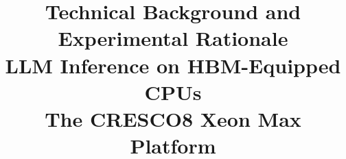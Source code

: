 \documentclass[11pt,a4paper]{article}
\title{\textbf{Technical Background and Experimental Rationale}\\[5pt]
       \Large LLM Inference on HBM-Equipped CPUs\\[3pt]
       \large The CRESCO8 Xeon Max Platform}
\author{}
\date{}
\begin{document}
\maketitle

\nocite{agrawal2025evaluating, arif2026inferencescaling, bi2026rooflinebench,
        chen2025ktransformers, chen2026memorybound, dongarra2026gpus,
        fang2025kvplacement, goto2026aurorahpl, he2024distributedcpu,
        ibeid2025aurora, jang2026hymcache, jang2026itme,
        kurt2026quantization, li2024hardwareperspective,
        lu2026thinfer, malakhov2025medlocalgpt, na2024llmcpu,
        peng2017hybridmemory, reguly2023xeonmax, salaria2025metametrics,
        shen2023efficientcpu, stuhlmann2025bench360,
        wei2025tmac, williams2009roofline, yuan2024roofline,
        zhang2024nomad, zhang2026cacheresident, zuo2026fairyfuse}
\nocite{cresco8doc, eneacresco8slides, eneapress, intel9480, intelmax,
        intelmaxtuning, llamacpp2026, lp1603}
\end{document}
